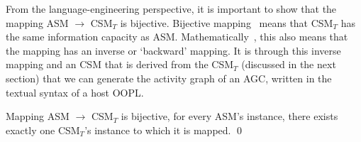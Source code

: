 From the language-engineering perspective, it is important to show that the mapping ASM $ \rightarrow $ CSM$_T$ is bijective. Bijective mapping~\cite{stevens_landscape_2008} means that CSM$_T$ has the same information capacity as ASM. Mathematically~\cite{weisstein_bijective_2018}, this also means that the mapping has an inverse or `backward' mapping. It is through this inverse mapping and an CSM that is derived from the CSM$_T$ (discussed in the next section) that we can generate the activity graph of an AGC, written in the textual syntax of a host OOPL.
%
\begin{theorem} \label{thm:mapping-cm2cmt}
	Mapping ASM $\rightarrow$ CSM$_T$ is bijective, \ie for every ASM's instance, there exists exactly one CSM$_T$'s instance to which it is mapped. \qed 
\end{theorem}

